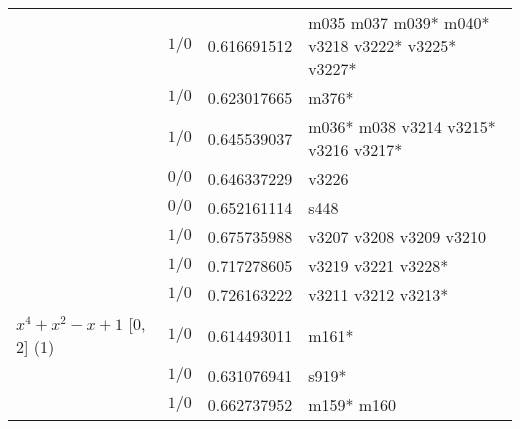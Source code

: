 \documentclass[a4paper]{amsart}
\newcommand{\PreserveBackslash}[1]{\let\temp =\\#1\let\\=\temp}
\theoremstyle{definition}
\begin{document}
\begin{table}[p]
\begin{tabular}{|>{\PreserveBackslash\raggedright}p{3.5cm} |l %
	|l %
	|>{\PreserveBackslash\raggedright}p{5cm}|}
& %
$1/0$ &
0.616691512&
{m035 m037 m039* m040* v3218 v3222*  v3225* v3227*} \\

\cline{2-4}

& %
$1/0$ &
0.623017665&
{m376*} \\

\cline{2-4}

& %
$1/0$ &
0.645539037&
{m036* m038 v3214 v3215* v3216 v3217*} \\

\cline{2-4}

& %
$0/0$ &
0.646337229 &
{v3226} \\

\cline{2-4}

& %
$0/0$ &
0.652161114 &
{s448} \\

\cline{2-4}

& %
$1/0$ &
0.675735988 &
{v3207 v3208 v3209 v3210} \\

\cline{2-4}

& %
$1/0$ &
0.717278605 &
{v3219 v3221 v3228*} \\

\cline{2-4}

& %
$1/0$ &
0.726163222 & %
{v3211 v3212 v3213*} \\

\hline



\hbox{$x^4 + x^2 - x + 1$} [0, 2] (1) &
$1/0$ &
 0.614493011&
{m161*} \\

\cline{2-4}

& %
$1/0$ &
 0.631076941&
{s919*} \\

\cline{2-4}

& %
$1/0$ &
 0.662737952&
{m159* m160} \\

\hline


\end{tabular}
\end{table}
\end{document}
